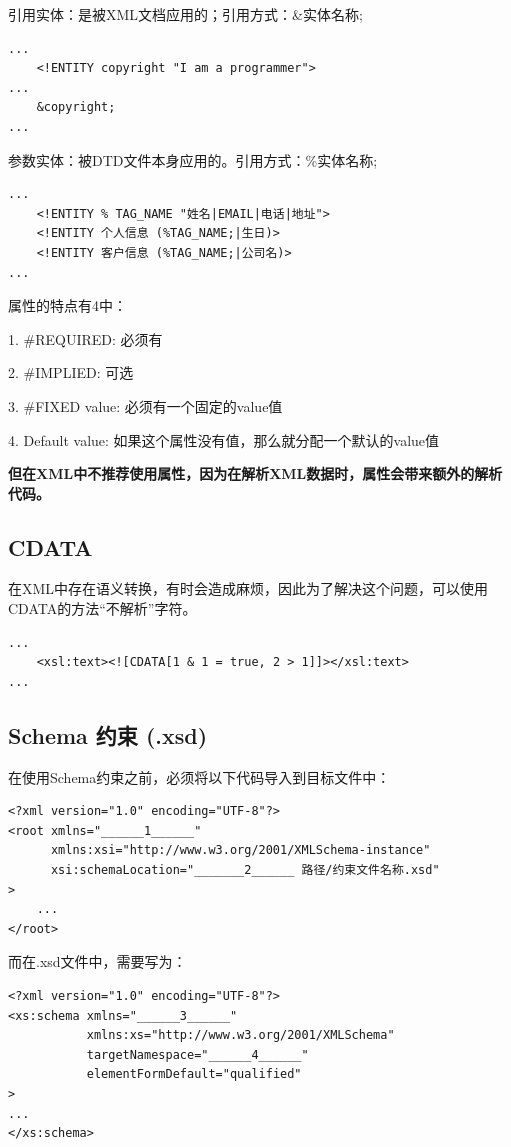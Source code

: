 \documentclass[fontset=windows]{article}
\begin{document}
\indent{} 引用实体：是被XML文档应用的；引用方式：\&实体名称;
\begin{verbatim}
...
	<!ENTITY copyright "I am a programmer">
...
	&copyright;
...
\end{verbatim}

\indent{} 参数实体：被DTD文件本身应用的。引用方式：\%实体名称;

\begin{verbatim}
...
	<!ENTITY % TAG_NAME "姓名|EMAIL|电话|地址">
	<!ENTITY 个人信息 (%TAG_NAME;|生日)>
    <!ENTITY 客户信息 (%TAG_NAME;|公司名)>
...
\end{verbatim}

\noindent 属性的特点有4中：

1. \#REQUIRED: 必须有

2. \#IMPLIED: 可选

3. \#FIXED value: 必须有一个固定的value值

4. Default value: 如果这个属性没有值，那么就分配一个默认的value值

\textbf{但在XML中不推荐使用属性，因为在解析XML数据时，属性会带来额外的解析代码。}

\subsection{CDATA}

在XML中存在语义转换，有时会造成麻烦，因此为了解决这个问题，可以使用CDATA的方法“不解析”字符。

\begin{verbatim}
...
	<xsl:text><![CDATA[1 & 1 = true, 2 > 1]]></xsl:text>
...
\end{verbatim}

\subsection{Schema 约束 (.xsd)}

在使用Schema约束之前，必须将以下代码导入到目标文件中：

\begin{verbatim}
<?xml version="1.0" encoding="UTF-8"?>
<root xmlns="______1______"
	  xmlns:xsi="http://www.w3.org/2001/XMLSchema-instance"
	  xsi:schemaLocation="_______2______ 路径/约束文件名称.xsd"
>
	...
</root>
\end{verbatim}

而在.xsd文件中，需要写为：

\begin{verbatim}
<?xml version="1.0" encoding="UTF-8"?>
<xs:schema xmlns="______3______"
		   xmlns:xs="http://www.w3.org/2001/XMLSchema"
		   targetNamespace="______4______"
		   elementFormDefault="qualified"
>
...
</xs:schema>
\end{verbatim}
\end{document}
